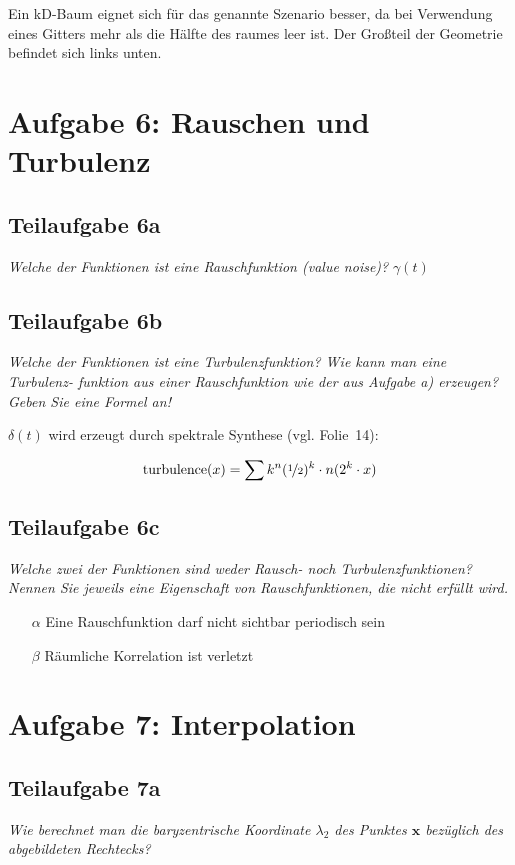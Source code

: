 \documentclass[a4paper]{scrartcl}
\begin{document}
Ein kD-Baum eignet sich für das genannte Szenario besser, da bei Verwendung
eines Gitters mehr als die Hälfte des raumes leer ist. Der Großteil der
Geometrie befindet sich links unten.

\section*{Aufgabe 6: Rauschen und Turbulenz}
\subsection*{Teilaufgabe 6a}
\textit{Welche der Funktionen ist eine Rauschfunktion (value noise)?}
$\gamma(t)$

\subsection*{Teilaufgabe 6b}
\textit{Welche der Funktionen ist eine Turbulenzfunktion? Wie kann man eine Turbulenz-
funktion aus einer Rauschfunktion wie der aus Aufgabe a) erzeugen? Geben Sie eine
Formel an!}

$\delta(t)$ wird erzeugt durch spektrale Synthese (vgl. Folie~14):

\[\text{turbulence}(x) = \sum{k}^n (\nicefrac{1}{2})^k \cdot n(2^k \cdot x)\]

\subsection*{Teilaufgabe 6c}
\textit{Welche zwei der Funktionen sind weder Rausch- noch Turbulenzfunktionen?
Nennen Sie jeweils eine Eigenschaft von Rauschfunktionen, die nicht erfüllt
wird.}

\begin{itemize}
    \item[$\alpha$] Eine Rauschfunktion darf nicht sichtbar periodisch sein
    \item[$\beta$] Räumliche Korrelation ist verletzt
\end{itemize}

\section*{Aufgabe 7: Interpolation}
\subsection*{Teilaufgabe 7a}
\textit{Wie berechnet man die baryzentrische Koordinate $\lambda_2$ des Punktes $\mathbf{x}$ bezüglich des
abgebildeten Rechtecks?}
\end{document}
